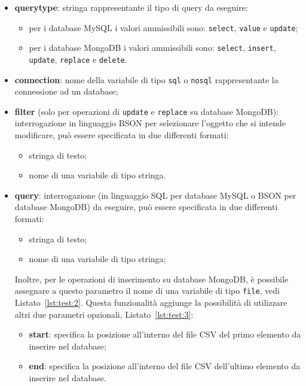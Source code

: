 \begin{itemize}
    \item \textbf{query\textunderscore type}: stringa rappresentante il tipo di query da eseguire:
    \begin{itemize}
        \item per i database MySQL i valori ammissibili sono: \verb|select|, \verb|value| e \verb|update|;
        \item per i database MongoDB i valori ammissibili sono: \verb|select|, \verb|insert|, \verb|update|, \verb|replace| e \verb|delete|.
    \end{itemize}
    \item \textbf{connection}: nome della variabile di tipo \verb|sql| o \verb|nosql| rappresentante la connessione ad un database;
    \item \textbf{filter} (solo per operazioni di \verb|update| e \verb|replace| su database MongoDB): interrogazione in linguaggio BSON per selezionare l'oggetto che si intende modificare, può essere specificata in due differenti formati:
    \begin{itemize}
        \item stringa di testo;
        \item nome di una variabile di tipo stringa.  
    \end{itemize} 
    \item \textbf{query}: interrogazione (in linguaggio SQL per database MySQL o BSON per database MongoDB) da eseguire, può essere specificata in due differenti formati:
    \begin{itemize}
        \item stringa di testo;
        \item nome di una variabile di tipo stringa;
    \end{itemize}
    Inoltre, per le operazioni di inserimento su database MongoDB, è possibile assegnare a questo parametro il nome di una variabile di tipo \verb|file|, vedi Listato~\ref{lst:test:2}. Questa funzionalità aggiunge la possibilità di utilizzare altri due parametri opzionali, Listato~\ref{lst:test:3}:
    \begin{itemize}
        \item \textbf{start}: specifica la posizione all'interno del file CSV del primo elemento da inserire nel database;
        \item \textbf{end}: specifica la posizione all'interno del file CSV dell'ultimo elemento da inserire nel database.
    \end{itemize}
\end{itemize}
